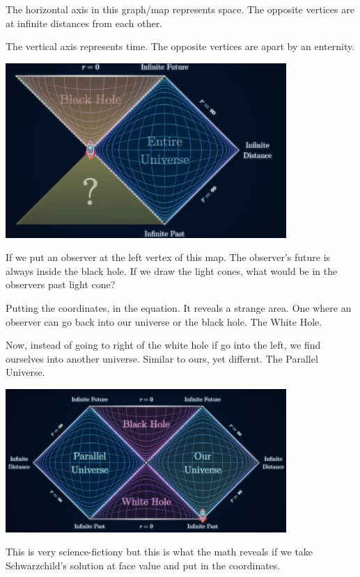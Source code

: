 \documentclass[12pt,a4paper]{article}
\begin{document}
The horizontal axis in this graph/map represents space. 
The opposite vertices are at infinite distances from each other.

The vertical axis represents time.
The opposite vertices are apart by an enternity.



\begin{center}
    \includegraphics[width=0.8\textwidth]{white_hole}    
\end{center}

If we put an observer at the left vertex of this map. The observer's future is always inside the black hole.
If we draw the light cones, what would be in the observers past light cone?

Putting the coordinates, in the equation. It reveals a strange area. 
One where an observer can go back into our universe or the black hole. The White Hole.

Now, instead of going to right of the white hole if go into the left, we find ourselves into another universe. Similar to ours, yet differnt. The Parallel Universe.
\begin{center}
    \includegraphics[width=0.8\textwidth]{whole_penrose_diagram}    
\end{center}

This is very science-fictiony but this is what the math reveals if we take Schwarzchild's solution at face value and put in the coordinates.
\end{document}
